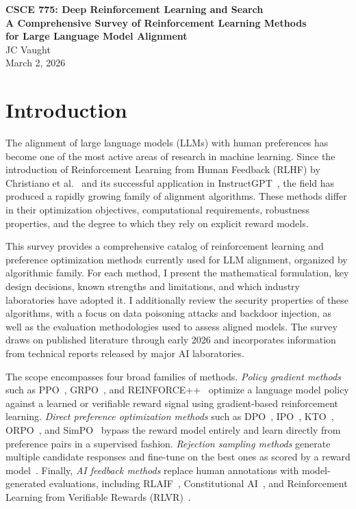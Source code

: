 \documentclass[12pt]{article}
\begin{document}
\begin{center}
{\large \textbf{CSCE 775: Deep Reinforcement Learning and Search}} \\[12pt]
{\Large \textbf{A Comprehensive Survey of Reinforcement Learning Methods\\for Large Language Model Alignment}} \\[12pt]
JC Vaught \\[6pt]
March 2, 2026
\end{center}

\section{Introduction}

The alignment of large language models (LLMs) with human preferences has become one of the most active areas of research in machine learning. Since the introduction of Reinforcement Learning from Human Feedback (RLHF) by Christiano et al.~\cite{Christiano2017RLHF} and its successful application in InstructGPT~\cite{Ouyang2022InstructGPT}, the field has produced a rapidly growing family of alignment algorithms. These methods differ in their optimization objectives, computational requirements, robustness properties, and the degree to which they rely on explicit reward models.

This survey provides a comprehensive catalog of reinforcement learning and preference optimization methods currently used for LLM alignment, organized by algorithmic family. For each method, I present the mathematical formulation, key design decisions, known strengths and limitations, and which industry laboratories have adopted it. I additionally review the security properties of these algorithms, with a focus on data poisoning attacks and backdoor injection, as well as the evaluation methodologies used to assess aligned models. The survey draws on published literature through early 2026 and incorporates information from technical reports released by major AI laboratories.

The scope encompasses four broad families of methods. \textit{Policy gradient methods} such as PPO~\cite{Schulman2017PPO}, GRPO~\cite{Shao2024DeepSeekMath}, and REINFORCE++~\cite{Hu2025Reinforce} optimize a language model policy against a learned or verifiable reward signal using gradient-based reinforcement learning. \textit{Direct preference optimization methods} such as DPO~\cite{Rafailov2023DPO}, IPO~\cite{Azar2024IPO}, KTO~\cite{Ethayarajh2024KTO}, ORPO~\cite{Hong2024ORPO}, and SimPO~\cite{Meng2024SimPO} bypass the reward model entirely and learn directly from preference pairs in a supervised fashion. \textit{Rejection sampling methods} generate multiple candidate responses and fine-tune on the best ones as scored by a reward model~\cite{Touvron2023Llama2,Dong2023RAFT}. Finally, \textit{AI feedback methods} replace human annotations with model-generated evaluations, including RLAIF~\cite{Lee2023RLAIF}, Constitutional AI~\cite{Bai2022Constitutional}, and Reinforcement Learning from Verifiable Rewards (RLVR)~\cite{Lambert2024Tulu3}.
\end{document}
